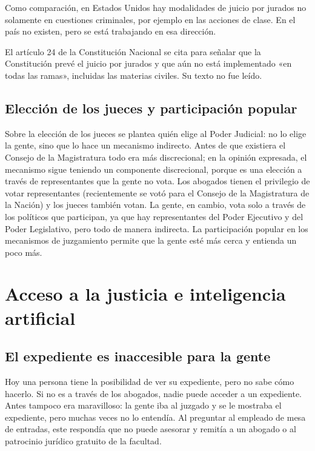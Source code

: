 \documentclass[12pt,oneside]{book}
\begin{document}
Como comparación, en Estados Unidos hay modalidades de juicio por jurados no solamente en cuestiones criminales, por ejemplo en las acciones de clase. En el país no existen, pero se está trabajando en esa dirección.

\begin{note}
El artículo 24 de la Constitución Nacional se cita para señalar que la Constitución prevé el juicio por jurados y que aún no está implementado «en todas las ramas», incluidas las materias civiles. Su texto no fue leído.
\end{note}

\subsection{Elección de los jueces y participación popular}

Sobre la elección de los jueces se plantea quién elige al Poder Judicial: no lo elige la gente, sino que lo hace un mecanismo indirecto. Antes de que existiera el Consejo de la Magistratura todo era más discrecional; en la opinión expresada, el mecanismo sigue teniendo un componente discrecional, porque es una elección a través de representantes que la gente no vota. Los abogados tienen el privilegio de votar representantes (recientemente se votó para el Consejo de la Magistratura de la Nación) y los jueces también votan. La gente, en cambio, vota solo a través de los políticos que participan, ya que hay representantes del Poder Ejecutivo y del Poder Legislativo, pero todo de manera indirecta. La participación popular en los mecanismos de juzgamiento permite que la gente esté más cerca y entienda un poco más.

\section{Acceso a la justicia e inteligencia artificial}

\subsection{El expediente es inaccesible para la gente}

Hoy una persona tiene la posibilidad de ver su expediente, pero no sabe cómo hacerlo. Si no es a través de los abogados, nadie puede acceder a un expediente. Antes tampoco era maravilloso: la gente iba al juzgado y se le mostraba el expediente, pero muchas veces no lo entendía. Al preguntar al empleado de mesa de entradas, este respondía que no puede asesorar y remitía a un abogado o al patrocinio jurídico gratuito de la facultad.
\end{document}
